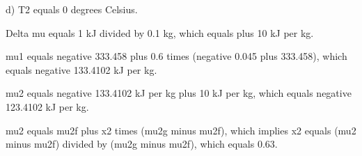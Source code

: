d) T2 equals 0 degrees Celsius.

Delta mu equals 1 kJ divided by 0.1 kg, which equals plus 10 kJ per kg.

mu1 equals negative 333.458 plus 0.6 times (negative 0.045 plus 333.458), which equals negative 133.4102 kJ per kg.

mu2 equals negative 133.4102 kJ per kg plus 10 kJ per kg, which equals negative 123.4102 kJ per kg.

mu2 equals mu2f plus x2 times (mu2g minus mu2f), which implies x2 equals (mu2 minus mu2f) divided by (mu2g minus mu2f), which equals 0.63.